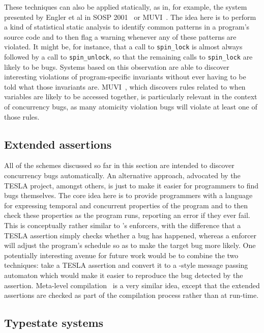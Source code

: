 These techniques can also be applied statically, as in, for example,
the system presented by Engler et al in SOSP
2001~\cite{Engler2001} or MUVI~\cite{Lu2007}.  The idea
here is to perform a kind of statistical static analysis to identify
common patterns in a program's source code and to then flag a warning
whenever any of these patterns are violated.  It might be, for
instance, that a call to \texttt{spin\_lock} is almost always followed
by a call to \texttt{spin\_unlock}, so that the remaining calls to
\texttt{spin\_lock} are likely to be bugs.  Systems based on this
observation are able to discover interesting violations of
program-specific invariants without ever having to be told what those
invariants are.  MUVI~\cite{Lu2007}, which discovers rules related to
when variables are likely to be accessed together, is particularly
relevant in the context of concurrency bugs, as many atomicity
violation bugs will violate at least one of those rules.

\subsection{Extended assertions}


All of the schemes discussed so far in this section are intended to
discover concurrency bugs automatically.  An alternative approach,
advocated by the TESLA project\needCite{}, amongst others, is just to
make it easier for programmers to find bugs themselves.  The core idea
here is to provide programmers with a language for expressing temporal
and concurrent properties of the program and to then check these
properties as the program runs, reporting an error if they ever fail.
This is conceptually rather similar to {\technique}'s enforcers, with
the difference that a TESLA assertion simply checks whether a bug has
happened, whereas a {\technique} enforcer will adjust the program's
schedule so as to make the target bug more likely.  One potentially
interesting avenue for future work would be to combine the two
techniques: take a TESLA assertion and convert it to a
{\implementation}-style message passing automaton which would make it
easier to reproduce the bug detected by the assertion.  Meta-level
compilation~\cite{Engler2000a} is a very similar idea, except that the
extended assertions are checked as part of the compilation process
rather than at run-time.

\subsection{Typestate systems}

